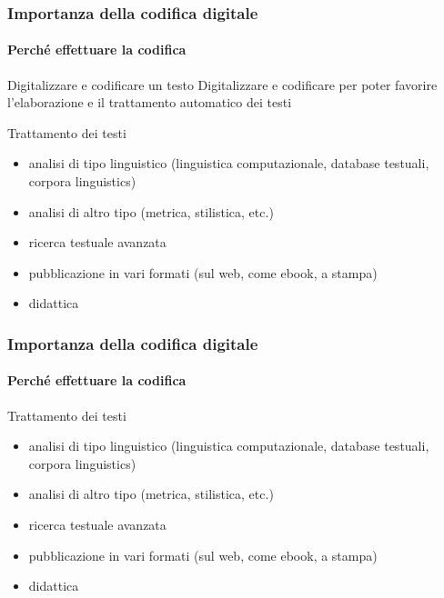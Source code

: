 
\begin{frame}
	\frametitle{Importanza della codifica digitale}
	\framesubtitle{Perché effettuare la codifica}
	\addtocounter{nframe}{1}

	\begin{block}{Digitalizzare e codificare un testo}
		Digitalizzare e codificare per poter favorire l'elaborazione e il trattamento automatico dei testi
	\end{block}

	\begin{block}{Trattamento dei testi}
		\begin{itemize}
			\item  analisi di tipo linguistico (linguistica computazionale,
			      database testuali, corpora linguistics)
			\item analisi di altro tipo (metrica, stilistica, etc.)
			\item ricerca testuale avanzata
			\item pubblicazione in vari formati (sul web, come ebook, a
			      stampa)
			\item didattica
		\end{itemize}

	\end{block}
\end{frame}

\begin{frame}
	\frametitle{Importanza della codifica digitale}
	\framesubtitle{Perché effettuare la codifica}
	\addtocounter{nframe}{1}

	\begin{block}{Trattamento dei testi}
		\begin{itemize}
			\item  analisi di tipo linguistico (linguistica computazionale,
			      database testuali, corpora linguistics)
			\item analisi di altro tipo (metrica, stilistica, etc.)
			\item ricerca testuale avanzata
			\item pubblicazione in vari formati (sul web, come ebook, a
			      stampa)
			\item didattica
		\end{itemize}

	\end{block}
\end{frame}


